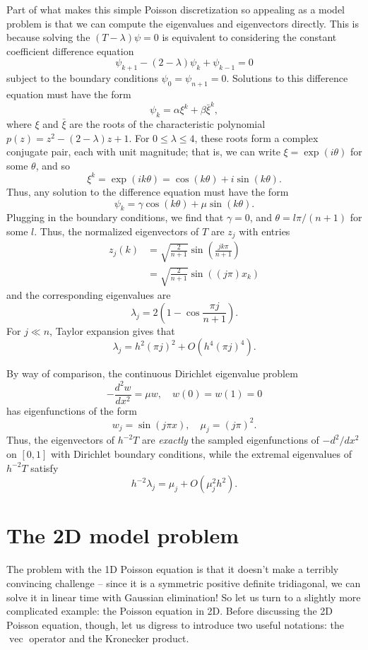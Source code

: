 \documentclass[12pt, leqno]{article} %
\begin{document}
Part of what makes this simple Poisson discretization so appealing as
a model problem is that we can compute the eigenvalues and eigenvectors
directly.  This is because solving the $(T-\lambda) \psi = 0$ is
equivalent to considering the constant coefficient difference equation
\[
  \psi_{k+1} - (2-\lambda) \psi_k + \psi_{k-1} = 0
\]
subject to the boundary conditions $\psi_0 = \psi_{n+1} = 0$.  Solutions to
this difference equation must have the form
\[
  \psi_{k} = \alpha \xi^k + \beta \bar{\xi}^k,
\]
where $\xi$ and $\bar{\xi}$ are the roots of the characteristic
polynomial $p(z) = z^2 - (2-\lambda) z + 1$.  For $0 \leq \lambda \leq 4$,
these roots form a complex conjugate pair, each with unit magnitude;
that is, we can write $\xi = \exp(i\theta)$ for some $\theta$, and so
\[
  \xi^k = \exp(ik\theta) = \cos(k\theta) + i \sin(k\theta).
\]
Thus, any solution to the difference equation must have the form
\[
  \psi_{k} = \gamma \cos(k\theta) + \mu \sin(k\theta).
\]
Plugging in the boundary conditions, we find that $\gamma = 0$,
and $\theta = l\pi/(n+1)$ for some $l$.  Thus, the normalized eigenvectors
of $T$ are $z_j$ with entries
\begin{align*}
  z_j(k) &= \sqrt{\frac{2}{n+1}} \sin\left( \frac{jk\pi}{n+1} \right) \\
         &= \sqrt{\frac{2}{n+1}} \sin( (j\pi) x_k )
\end{align*}
and the corresponding eigenvalues are
\[
  \lambda_j = 2 \left( 1 - \cos \frac{\pi j}{n+1} \right).
\]
For $j \ll n$, Taylor expansion gives that
\[
  \lambda_j = h^2 (\pi j)^2 + O\left( h^4 (\pi j)^4 \right).
\]

By way of comparison, the continuous Dirichlet eigenvalue
problem
\[
  -\frac{d^2 w}{dx^2} = \mu w, \quad w(0) = w(1) = 0
\]
has eigenfunctions of the form
\[
  w_j = \sin(j\pi x), \quad \mu_j = (j \pi)^2.
\]
Thus, the eigenvectors of $h^{-2} T$ are {\em exactly} the sampled
eigenfunctions of $-d^2/dx^2$ on $[0,1]$ with Dirichlet boundary
conditions, while the extremal eigenvalues of $h^{-2} T$ satisfy
\[
  h^{-2} \lambda_j = \mu_j + O(\mu_j^2 h^2).
\]

\section{The 2D model problem}

The problem with the 1D Poisson equation is that it doesn't make a
terribly convincing challenge -- since it is a symmetric positive
definite tridiagonal, we can solve it in linear time with Gaussian
elimination!  So let us turn to a slightly more complicated example:
the Poisson equation in 2D.  Before discussing the 2D Poisson
equation, though, let us digress to introduce two useful notations:
the $\operatorname{vec}$ operator and the Kronecker product.
\end{document}
